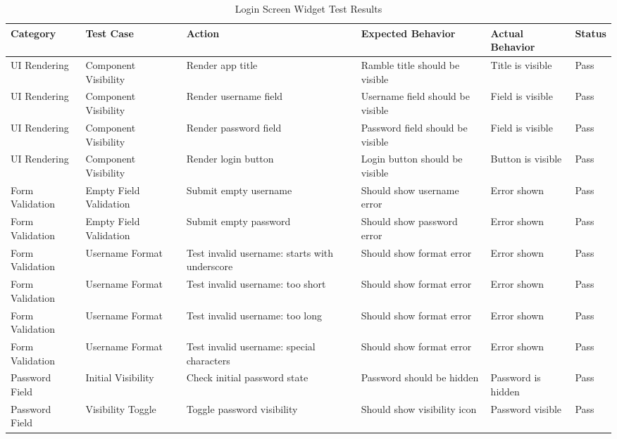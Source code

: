 \begin{table*}[t]
\centering
\caption{Login Screen Widget Test Results}
\label{tab:login_screen_widget}
\begin{tabular}{|p{2.5cm}|p{2.5cm}|p{3cm}|p{3cm}|p{3cm}|p{1cm}|}
\hline
\textbf{Category} & \textbf{Test Case} & \textbf{Action} & \textbf{Expected Behavior} & \textbf{Actual Behavior} & \textbf{Status} \\ \hline
UI Rendering & Component Visibility & Render app title & Ramble title should be visible & Title is visible & Pass \\ \hline
UI Rendering & Component Visibility & Render username field & Username field should be visible & Field is visible & Pass \\ \hline
UI Rendering & Component Visibility & Render password field & Password field should be visible & Field is visible & Pass \\ \hline
UI Rendering & Component Visibility & Render login button & Login button should be visible & Button is visible & Pass \\ \hline
Form Validation & Empty Field Validation & Submit empty username & Should show username error & Error shown & Pass \\ \hline
Form Validation & Empty Field Validation & Submit empty password & Should show password error & Error shown & Pass \\ \hline
Form Validation & Username Format & Test invalid username: starts with underscore & Should show format error & Error shown & Pass \\ \hline
Form Validation & Username Format & Test invalid username: too short & Should show format error & Error shown & Pass \\ \hline
Form Validation & Username Format & Test invalid username: too long & Should show format error & Error shown & Pass \\ \hline
Form Validation & Username Format & Test invalid username: special characters & Should show format error & Error shown & Pass \\ \hline
Password Field & Initial Visibility & Check initial password state & Password should be hidden & Password is hidden & Pass \\ \hline
Password Field & Visibility Toggle & Toggle password visibility & Should show visibility icon & Password visible & Pass \\ \hline
\end{tabular}
\end{table*}
